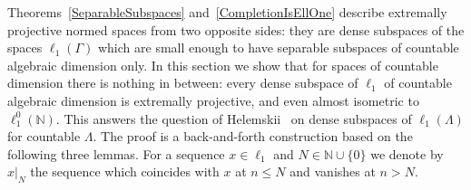 \documentclass[12pt]{article}
\newcommand{\lo}[1]{\ell_1^0(#1)}
\newcommand{\ellone}[1]{\ell_1(#1)}
\begin{document}
Theorems~\ref{SeparableSubspaces}
and~\ref{CompletionIsEllOne} describe extremally projective normed spaces
from two opposite sides: they are dense subspaces of the spaces
$\ellone{\Gamma}$ which are small enough to have separable subspaces of
countable algebraic dimension only. In this section we show that for spaces of
countable dimension there is nothing in between: every dense subspace of
$\ell_1$ of countable algebraic dimension is extremally projective, and even
almost isometric to $\lo{\mathbb{N}}$. This answers the question of
Helemskii~\cite[section 2]{HelExtrProjSeqAlg} on dense subspaces of
$\ellone{\Lambda}$ for countable $\Lambda$. The proof is a back-and-forth
construction based on the following three lemmas. For a sequence
$x\in\ell_1$ and $N\in\mathbb{N}\cup\{0\}$ we denote by $x|_N$ the sequence
which coincides with $x$ at $n\leq N$ and vanishes at $n>N$.
\end{document}
